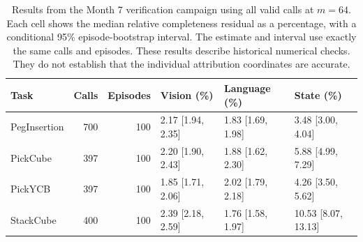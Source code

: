 \begin{table}[htbp]
\centering\small
\setlength{\tabcolsep}{3.5pt}
\caption{Results from the Month 7 verification campaign using all valid calls at $m=64$. Each cell shows the median relative completeness residual as a percentage, with a conditional 95\% episode-bootstrap interval. The estimate and interval use exactly the same calls and episodes. These results describe historical numerical checks. They do not establish that the individual attribution coordinates are accurate.}
\label{tab:correctness}
\begin{tabular}{lrrlll}
\toprule
Task & Calls & Episodes & Vision (\%) & Language (\%) & State (\%) \\
\midrule
PegInsertion & 700 & 100 & 2.17 [1.94, 2.35] & 1.83 [1.69, 1.98] & 3.48 [3.00, 4.04] \\
PickCube & 397 & 100 & 2.20 [1.90, 2.43] & 1.88 [1.62, 2.30] & 5.88 [4.99, 7.29] \\
PickYCB & 397 & 100 & 1.85 [1.71, 2.06] & 2.02 [1.79, 2.18] & 4.26 [3.50, 5.62] \\
StackCube & 400 & 100 & 2.39 [2.18, 2.59] & 1.76 [1.58, 1.97] & 10.53 [8.07, 13.13] \\
\bottomrule
\end{tabular}
\end{table}

